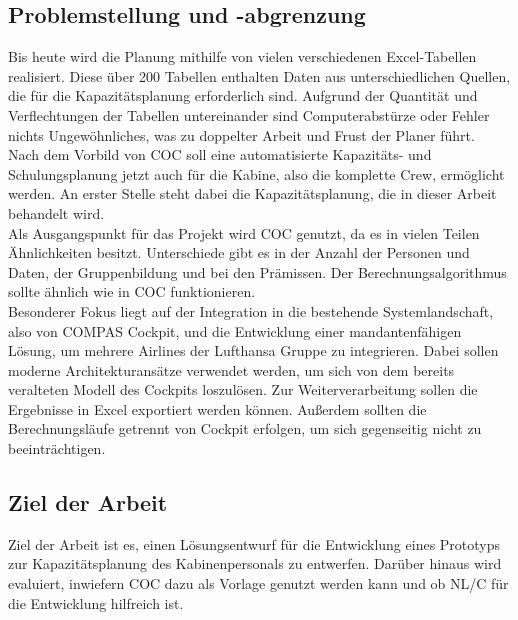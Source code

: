 \documentclass [12pt, a4paper, oneside, titlepage, ngerman]{article}
\begin{document}
\subsection {Problemstellung und -abgrenzung}
Bis heute wird die Planung mithilfe von vielen verschiedenen Excel-Tabellen realisiert. Diese über 200 Tabellen enthalten Daten aus unterschiedlichen Quellen, die für die Kapazitätsplanung erforderlich sind. Aufgrund der Quantität und Verflechtungen der Tabellen untereinander sind Computerabstürze oder Fehler nichts Ungewöhnliches, was zu doppelter Arbeit und Frust der Planer führt. \\
Nach dem Vorbild von COC soll eine automatisierte Kapazitäts- und Schulungsplanung jetzt auch für die Kabine, also die komplette Crew, ermöglicht werden. An erster Stelle steht dabei die Kapazitätsplanung, die in dieser Arbeit behandelt wird. \\
Als Ausgangspunkt für das Projekt wird COC genutzt, da es in vielen Teilen Ähnlichkeiten besitzt. Unterschiede gibt es in der Anzahl der Personen und Daten, der Gruppenbildung und bei den Prämissen. Der Berechnungsalgorithmus sollte ähnlich wie in COC funktionieren. \\
Besonderer Fokus liegt auf der Integration in die bestehende Systemlandschaft, also von COMPAS Cockpit, und die Entwicklung einer mandantenfähigen Lösung, um mehrere Airlines der Lufthansa Gruppe zu integrieren. Dabei sollen moderne Architekturansätze verwendet werden, um sich von dem bereits veralteten Modell des Cockpits loszulösen.
Zur Weiterverarbeitung sollen die Ergebnisse in Excel exportiert werden können. Außerdem sollten die Berechnungsläufe getrennt von Cockpit erfolgen, um sich gegenseitig nicht zu beeinträchtigen.

\subsection {Ziel der Arbeit}
Ziel der Arbeit ist es, einen Lösungsentwurf für die Entwicklung eines Prototyps zur Kapazitätsplanung des Kabinenpersonals zu entwerfen. Darüber hinaus wird evaluiert, inwiefern COC dazu als Vorlage genutzt werden kann und ob NL/C für die Entwicklung hilfreich ist.
\end{document}
